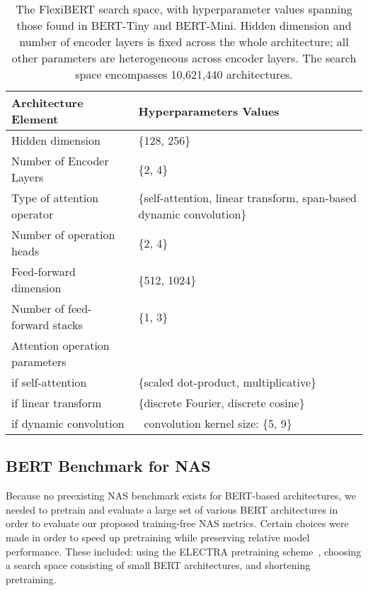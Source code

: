 \documentclass[11pt]{article}
\begin{document}
    \begin{table*}[h]
        \centering 
        \begin{tabular}{|l|l|}
        \hline
        \textbf{Architecture Element} & \textbf{Hyperparameters Values} \\
        \hline
        Hidden dimension & \{128, 256\} \\
        \hline
        Number of Encoder Layers & \{2, 4\} \\
        \hline
        \hline
        Type of attention operator & \{self-attention, linear transform, span-based dynamic convolution\} \\
        \hline
        Number of operation heads & \{2, 4\} \\
        \hline
        Feed-forward dimension & \{512, 1024\} \\
        \hline
        Number of feed-forward stacks & \{1, 3\} \\
        \hline
        Attention operation parameters & \\
        \quad if self-attention & \{scaled dot-product, multiplicative\} \\
        \quad if linear transform & \{discrete Fourier, discrete cosine\} \\
        \quad if dynamic convolution & \ convolution kernel size: \{5, 9\} \\
        \hline
        \end{tabular}
        \caption{The FlexiBERT search space, with hyperparameter values spanning those found in BERT-Tiny and BERT-Mini. Hidden dimension and number of encoder layers is fixed across the whole architecture; all other parameters are heterogeneous across encoder layers. The search space encompasses 10,621,440 architectures.}
         \label{table1}
    \end{table*}

\subsection{BERT Benchmark for NAS}
    Because no preexisting NAS benchmark exists for BERT-based architectures, we needed to pretrain and evaluate a large set of various BERT architectures in order to evaluate our proposed training-free NAS metrics. Certain choices were made in order to speed up pretraining while preserving relative model performance. These included: using the ELECTRA pretraining scheme~\cite{clark_electra_2020}, choosing a search space consisting of small BERT architectures, and shortening pretraining. 
\end{document}
